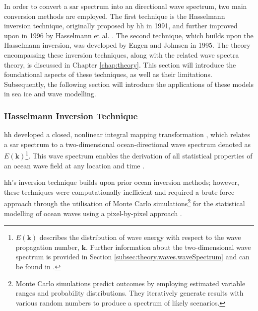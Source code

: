In order to convert a \acs{sar} spectrum into an directional wave spectrum, two main conversion methods are employed. The first technique is the Hasselmann inversion technique, originally proposed by \ac{hh} \cite{Hasselmann1991} in 1991, and further improved upon in 1996 by Hasselmann et al. \cite{Hasselmann1996}. The second technique, which builds upon the Hasselmann inversion, was developed by Engen and Johnsen \cite{Engen1995} in 1995. The theory encompassing these inversion techniques, along with the related wave spectra theory, is discussed in Chapter \ref{chap:theory}. This section will introduce the foundational aspects of these techniques, as well as their limitations. Subsequently, the following section will introduce the applications of these models in sea ice and wave modelling.

\subsubsection{Hasselmann Inversion Technique} \label{subsubsec:litReview.sarCharac.oceanWaveInversion.Hasselmann}

\ac{hh} developed a closed, nonlinear integral mapping transformation \cite{Wadhams2002}, which relates a \acs{sar} spectrum to a two-dimensional ocean-directional wave spectrum denoted as $E(\mathbf{k})$\footnote{$E(\mathbf{k})$ describes the distribution of wave energy with respect to the wave propagation number, $\mathbf{k}$. Further information about the two-dimensional wave spectrum is provided in Section \ref{subsec:theory.waves.waveSpectrum} and can be found in \cite{Hasselmann1991, Holthuijsen2007}.}. This wave spectrum enables the derivation of all statistical properties of an ocean wave field at any location and time \cite{Hasselmann1991}.

\ac{hh}'s inversion technique builds upon prior ocean inversion methods; however, these techniques were computationally inefficient and required a brute-force approach through the utilisation of Monte Carlo simulations\footnote{Monte Carlo simulations predict outcomes by employing estimated variable ranges and probability distributions. They iteratively generate results with various random numbers to produce a spectrum of likely scenarios.} for the statistical modelling of ocean waves using a pixel-by-pixel approach \cite{Hasselmann1991}.

